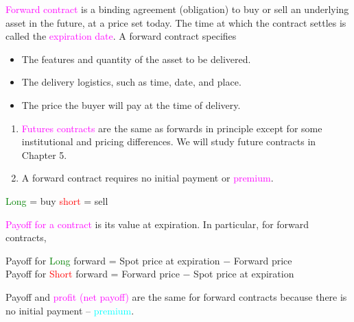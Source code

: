 \def\mySecNum{2.1}
\mySection{\mySecNum~Forward contracts}
\begin{frame}[fragile,t]
	\begin{mydefinition}
		\textcolor{magenta}{Forward contract} is a binding agreement (obligation) to buy or sell an
		underlying asset in the future, at a price set today.  The time at which the contract settles is
		called the \textcolor{magenta}{expiration date}.  A forward contract specifies
		\begin{itemize}
			\item The features and quantity of the asset to be delivered.
			\item The delivery logistics, such as time, date, and place.
			\item The price the buyer will pay at the time of delivery.
		\end{itemize}
	\end{mydefinition}
	\bigskip
	\begin{remark}
		\begin{enumerate}
			\item \textcolor{magenta}{Futures contracts} are the same as forwards in principle except for
				some institutional and pricing differences. We will study future contracts in Chapter 5.
			\item A forward contract requires no initial payment or \textcolor{magenta}{premium}.
		\end{enumerate}
	\end{remark}
\end{frame}
\begin{frame}[fragile,t]
	\begin{center}
		\textcolor{green}{Long} = buy \qquad \textcolor{red}{short} = sell
	\end{center}

	\bigskip
	\begin{mydefinition}
		\textcolor{magenta}{Payoff for a contract} is its value at expiration. In particular, for
		forward contracts,
		\bigskip
		\begin{center}
			Payoff for \textcolor{green}{Long} forward = Spot price at expiration $-$ Forward price \\ \bigskip
			Payoff for \textcolor{red}{Short} forward = Forward price $-$ Spot price at expiration
		\end{center}
	\end{mydefinition}
	\vfill

	\begin{remark}
		Payoff and \textcolor{magenta}{profit (net payoff)} are the same for forward contracts because
		there is no initial payment -- \textcolor{cyan}{premium}.
	\end{remark}
\end{frame}
